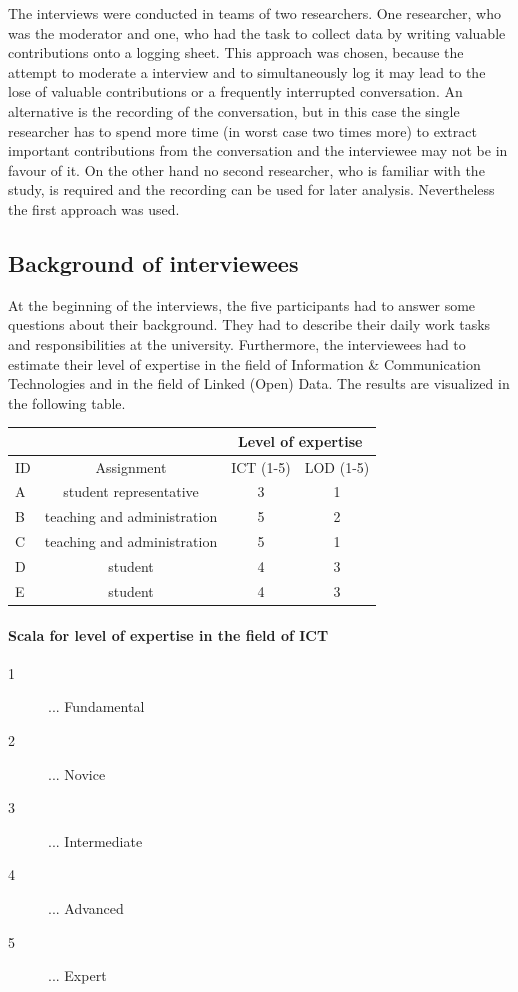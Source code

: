 \documentclass{article}
\begin{document}
The interviews were conducted in teams of two researchers. One researcher, who was the moderator and one, who had the task to collect data by writing valuable contributions onto a logging sheet. This approach was chosen, because the attempt to moderate a interview and to simultaneously log it may lead to the lose of valuable contributions or a frequently interrupted conversation. An alternative is the recording of the conversation, but in this case the single researcher has to spend more time (in worst case two times more) to extract important contributions from the conversation and the interviewee may not be in favour of it. On the other hand no second researcher, who is familiar with the study, is required and the recording can be used for later analysis. Nevertheless the first approach was used.

\subsection{Background of interviewees}
\label{lod-benefits-challenges:interviewees}
At the beginning of the interviews, the five participants had to answer some questions about their background. They had to describe their daily work tasks and responsibilities at the university. Furthermore, the interviewees had to estimate their level of expertise in the field of Information \& Communication Technologies and in the field of Linked (Open) Data. The results are visualized in the following table. \\

\begin{tabular}{| l | c | c | c |}
 	\multicolumn{2}{c|}{} & \multicolumn{2}{c|}{Level of expertise} \\
 	\hline
	ID & Assignment & ICT (1-5) & LOD (1-5) \\
	\hline
	A  & student representative & 3 & 1 \\
	B & teaching and administration & 5 & 2 \\
	C & teaching and administration & 5 & 1 \\
	D & student & 4 & 3 \\
	E & student & 4 & 3 \\
	\hline
\end{tabular}

\paragraph*{Scala for level of expertise in the field of ICT}
\begin{description}
	\item[1] ... Fundamental
	\item[2] ... Novice
	\item[3] ... Intermediate
	\item[4] ... Advanced
	\item[5] ... Expert
\end{description}
\end{document}

